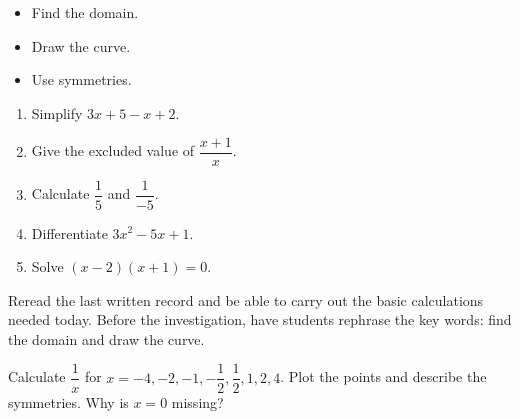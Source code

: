 \begin{objectifs}\begin{itemize}\item Find the domain.\item Draw the curve.\item Use symmetries.\end{itemize}\end{objectifs}
\begin{automatismes}\begin{enumerate}\item Simplify $3x+5-x+2$. \item Give the excluded value of $\dfrac{x+1}{x}$. \item Calculate $\dfrac1{5}$ and $\dfrac1{-5}$. \item Differentiate $3x^2-5x+1$. \item Solve $(x-2)(x+1)=0$. \end{enumerate}\end{automatismes}
\begin{prerequis}Reread the last written record and be able to carry out the basic calculations needed today. Before the investigation, have students rephrase the key words: find the domain and draw the curve.\end{prerequis}

\begin{activite}
Calculate $\dfrac1x$ for $x=-4,-2,-1,-\dfrac12,\dfrac12,1,2,4$. Plot the points and describe the symmetries. Why is $x=0$ missing?
\begin{center}\end{center}
\end{activite}

